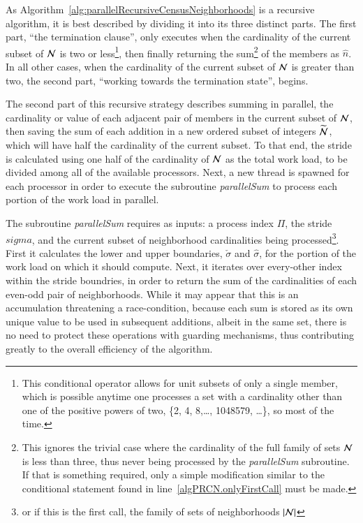 As Algorithm~\ref{alg:parallelRecursiveCensusNeighborhoods} is a recursive algorithm, it is best described by dividing it into its three distinct parts. The first part, ``the termination clause'', only executes when the cardinality of the current subset of $\mathcal{N}$ is two or less\footnote{This conditional operator allows for unit subsets of only a single member, which is possible anytime one processes a set with a cardinality other than one of the positive powers of two, \{2, 4, 8,\ldots , 1048579, \ldots\}, so most of the time.}, then finally returning the sum\footnote{This ignores the trivial case where the cardinality of the full family of sets $\mathcal{N}$ is less than three, thus never being processed by the \textit{parallelSum} subroutine. If that is something required, only a simple modification similar to the conditional statement found in line~\ref{algPRCN.onlyFirstCall} must be made.} of the members as $\hat{n}$. In all other cases, when the cardinality of the current subset of $\mathcal{N}$ is greater than two, the second part, ``working towards the termination state'', begins.

The second part of this recursive strategy describes summing in parallel, the cardinality or value of each adjacent pair of members in the current subset of $\mathcal{N}$, then saving the sum of each addition in a new ordered subset of integers $\widetilde{\mathcal{N}}$, which will have half the cardinality of the current subset. To that end, the stride is calculated using one half of the cardinality of $\mathcal{N}$ as the total work load, to be divided among all of the available processors. Next, a new thread is spawned for each processor in order to execute the subroutine \textit{parallelSum} to process each portion of the work load in parallel.

The subroutine \textit{parallelSum} requires as inputs: a process index $\Pi$, the stride $sigma$, and the current subset of neighborhood cardinalities being processed\footnote{or if this is the first call, the family of sets of neighborhoods $|\mathcal{N}|$}. First it calculates the lower and upper boundaries, $\check{\sigma}$ and $\hat{\sigma}$, for the portion of the work load on which it should compute. Next, it iterates over every-other index within the stride boundries, in order to return the sum of the cardinalities of each even-odd pair of neighborhoods. While it may appear that this is an accumulation threatening a race-condition, because each sum is stored as its own unique value to be used in subsequent additions, albeit in the same set, there is no need to protect these operations with guarding mechanisms, thus contributing greatly to the overall efficiency of the algorithm.

